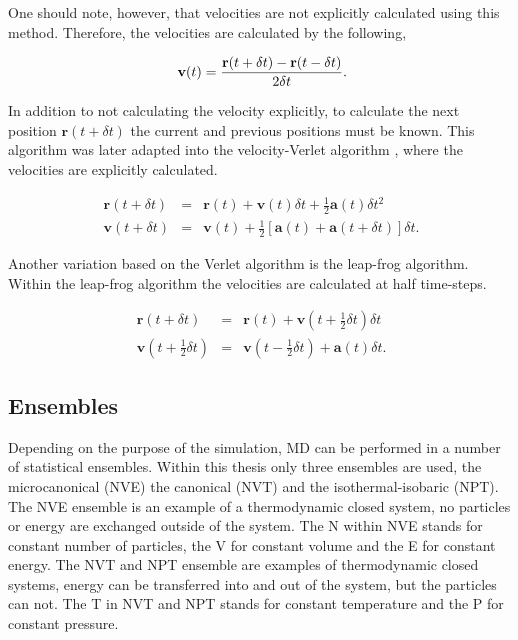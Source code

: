 One should note, however, that velocities are not explicitly calculated using this method.  Therefore, the velocities are calculated by the following,

\begin{equation}
\ \mathbf{v}(t) = \frac{\mathbf{r}(t + \delta t) - \mathbf{r}(t - \delta t)}{2 \delta t} \\.
\end{equation}

In addition to not calculating the velocity explicitly, to calculate the next position $\mathbf{r}(t+\delta t)$ the current and previous positions must be known.  This algorithm was later adapted into the velocity-Verlet algorithm \cite{velocity_verlet}, where the velocities are explicitly calculated.

\begin{eqnarray}
\ \mathbf{r}(t+ \delta t) &=& \mathbf{r}(t) + \mathbf{v}(t) \delta t + \frac{1}{2} \mathbf{a}(t) \delta t^2 \\
\ \mathbf{v}(t+ \delta t) &=& \mathbf{v}(t) + \frac{1}{2}[ \mathbf{a}(t) + \mathbf{a}(t+ \delta t) ] \delta t .
\end{eqnarray}

Another variation based on the Verlet algorithm is the leap-frog algorithm.  Within the leap-frog algorithm the velocities are calculated at half time-steps.

\begin{eqnarray}
\ \mathbf{r}(t + \delta t) &=& \mathbf{r}(t) + \mathbf{v} \left( t + \frac{1}{2} \delta t \right) \delta t \\
\ \mathbf{v} \left( t + \frac{1}{2} \delta t \right) &=& \mathbf{v} \left( t - \frac{1}{2}  \delta t \right) + \mathbf{a} (t) \delta t . 
\end{eqnarray}

\subsection{Ensembles}

Depending on the purpose of the simulation, MD can be performed in a number of statistical ensembles.  Within this thesis only three ensembles are used, the microcanonical (NVE) the canonical (NVT) and the isothermal-isobaric (NPT).  The NVE ensemble is an example of a thermodynamic closed system, no particles or energy are exchanged outside of the system.  The N within NVE stands for constant number of particles, the V for constant volume and the E for constant energy.  The NVT and NPT ensemble are examples of thermodynamic closed systems, energy can be transferred into and out of the system, but the particles can not.  The T in NVT and NPT stands for constant temperature and the P for constant pressure.  

